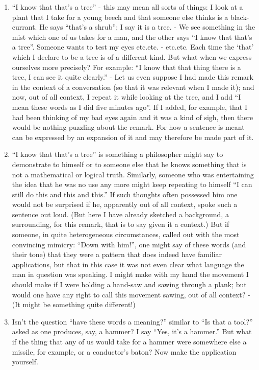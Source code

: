 \documentclass{book}
\begin{document}
\begin{enumerate}
\item
``I know that that's a tree'' - this may mean all sorts of things: I look at a
plant that I take for a young beech and that someone else thinks is a
black-currant. He says ``that's a shrub''; I say it is a tree. - We see
something in the mist which one of us takes for a man, and the other says ``I
know that that's a tree''. Someone wants to test my eyes etc.etc. - etc.etc.
Each time the `that' which I declare to be a tree is of a different kind.  But
what when we express ourselves more precisely? For example: ``I know that that
thing there is a tree, I can see it quite clearly.'' - Let us even suppose I
had made this remark in the context of a conversation (so that it was relevant
when I made it); and now, out of all context, I repeat it while looking at the
tree, and I add ``I mean these words as I did five minutes ago''. If I added,
for example, that I had been thinking of my bad eyes again and it was a kind of
sigh, then there would be nothing puzzling about the remark.  For how a
sentence is meant can be expressed by an expansion of it and may therefore be
made part of it.

\item
``I know that that's a tree'' is something a philosopher might say to
demonstrate to himself or to someone else that he knows something that is not a
mathematical or logical truth. Similarly, someone who was entertaining the idea
that he was no use any more might keep repeating to himself ``I can still do
this and this and this.'' If such thoughts often possessed him one would not be
surprised if he, apparently out of all context, spoke such a sentence out loud.
(But here I have already sketched a background, a surrounding, for this remark,
that is to say given it a context.) But if someone, in quite heterogeneous
circumstances, called out with the most convincing mimicry: ``Down with him!'',
one might say of these words (and their tone) that they were a pattern that
does indeed have familiar applications, but that in this case it was not even
clear what language the man in question was speaking. I might make with my hand
the movement I should make if I were holding a hand-saw and sawing through a
plank; but would one have any right to call this movement sawing, out of all
context? - (It might be something quite different!)

\item
Isn't the question ``have these words a meaning?'' similar to ``Is that a
tool?'' asked as one produces, say, a hammer? I say ``Yes, it's a hammer.'' But
what if the thing that any of us would take for a hammer were somewhere else a
missile, for example, or a conductor's baton? Now make the application
yourself.


\end{enumerate}
\end{document}
